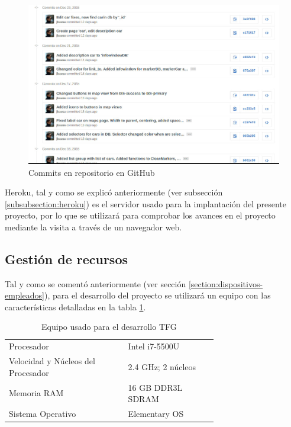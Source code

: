 \begin{figure}[h!btp]
\centering
\includegraphics[scale=0.5, fbox={\fboxrule} 4mm]{images/05-resultados/02-git.jpg}
\caption{Commits en repositorio en GitHub}
\label{fig:github}
\end{figure}
	
	Heroku, tal y como se explicó anteriormente (ver subsección \ref{subsubsection:heroku}) es el servidor usado para la implantación del presente proyecto, por lo que se utilizará para comprobar los avances en el proyecto mediante la visita a través de un navegador web.
	
	\subsection{Gestión de recursos}
	Tal y como se comentó anteriormente (ver sección \ref{section:dispositivos-empleados}), para el desarrollo del proyecto se utilizará un equipo con las características detalladas en la tabla \ref{tab:portatil2}. 
	
	\begin{table}[H]
	  \centering 
	  \begin{tabular}{p{0.4\linewidth}p{0.3\linewidth}}
	    \toprule
		Procesador 							& Intel i7-5500U								\\
		Velocidad y Núcleos del Procesador & 2.4 GHz; 2 núcleos 							\\
		Memoria RAM 						& 16 \ac{GB} \ac{DDR}3L \ac{SDRAM} 			\\
		Sistema Operativo					& Elementary \ac{OS} 							\\
	    \hline
	  \end{tabular}
	  \caption{Equipo usado para el desarrollo \ac{TFG}}
	  \label{tab:portatil2}
	\end{table}
	
